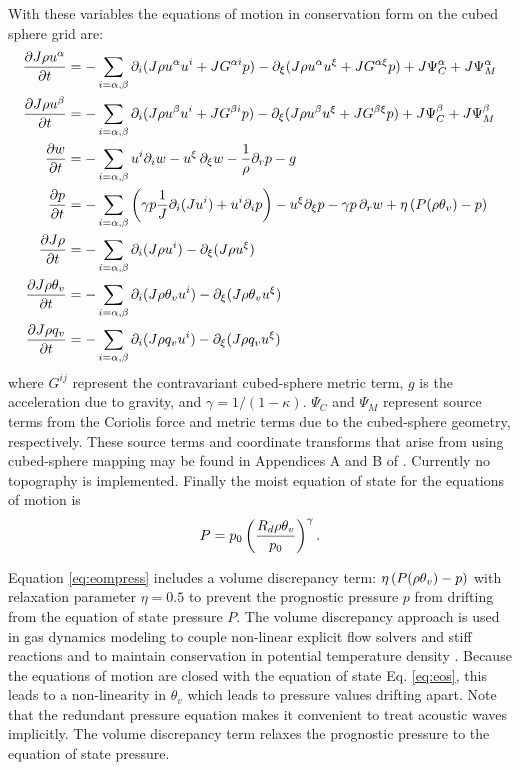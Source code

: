 With these variables the equations of motion in conservation form on the cubed sphere grid are:
\begin{align}
\frac{\partial J \rho u^{\alpha}}{\partial t} &=  - \sum_{i=\alpha, \beta} \partial_i (J \rho u^{\alpha} u^i + JG^{\alpha i} p )
    - \partial_{\xi} (J \rho u^{\alpha} u^{\xi} + JG^{\alpha \xi} p)  + J \Psi_C^\alpha + J \Psi_M^\alpha\\
\frac{\partial J \rho u^{\beta}}{\partial t} &=  - \sum_{i=\alpha, \beta} \partial_i (J \rho u^{\beta} u^i + JG^{\beta i} p )
    - \partial_{\xi} (J \rho u^{\beta} u^{\xi} + JG^{\beta \xi} p)
    + J \Psi_C^\beta + J \Psi_M^\beta \\
\frac{ \partial w}{\partial t} &=   - \sum_{i=\alpha, \beta} u^i \partial_i w - u^{\xi} \, \partial_{\xi} w - \frac{1}{\rho} \partial_{r} p - g \\
\frac{\partial p}{\partial t} &=   - \sum_{i=\alpha, \beta} \left( \gamma p \frac{1}{J} \partial_i (J u^i) 
    + u^i \partial_i p \right) - u^{\xi} \partial_{\xi} p  - \gamma p \, \partial_{r} w  + \eta \left(P(\rho \theta_v) -p \right) \label{eq:eompress}\\
\frac{ \partial J \rho}{\partial t} &=  - \sum_{i=\alpha, \beta} \partial_i (J \rho u^i) - \partial_{\xi} ( J \rho u^{\xi} ) \\
\frac{ \partial J \rho \theta_v}{\partial t} &=  - \sum_{i=\alpha, \beta} \partial_i (J \rho \theta_v u^i) - \partial_{\xi} ( J \rho \theta_v u^{\xi} ) \\
\frac{ \partial J \rho q_v}{\partial t} &=  - \sum_{i=\alpha, \beta} \partial_i (J \rho q_v u^i) - \partial_{\xi} ( J \rho q_v u^{\xi} )
\end{align}
where $G^{ij}$ represent the contravariant cubed-sphere metric term, $g$ is the acceleration
due to gravity, and $\gamma = 1 / (1 - \kappa)$. $\Psi_C$ and $\Psi_M$ represent source terms
from the Coriolis force and metric terms due to the cubed-sphere geometry, respectively. 
These source terms and coordinate transforms that arise from using cubed-sphere mapping may be found in
Appendices A and B of \cite{ullrich2012mcore}.
Currently no topography is implemented. 
Finally the moist equation of state for the equations of motion is
\begin{equation}
\label{eq:eos}
P = p_0\left(\frac{R_d\rho \theta_v}{p_0}\right)^\gamma.
\end{equation}

Equation \ref{eq:eompress} includes a volume discrepancy term: $\eta \left(P(\rho \theta_v) -p \right)$ 
with relaxation parameter $\eta = 0.5 $ to prevent the 
prognostic pressure $p$ from drifting from the equation of state pressure $P$. 
The volume discrepancy approach is used in gas dynamics 
modeling to couple non-linear explicit flow solvers and stiff 
reactions and to maintain conservation in potential 
temperature density \citep{day2000numerical}. Because the equations
of motion are closed with the equation of state Eq. \ref{eq:eos}, this leads to a non-linearity in
$\theta_v$ which leads to pressure values drifting apart. Note that the redundant pressure equation
makes it convenient to treat acoustic waves implicitly. 
The volume discrepancy term relaxes the prognostic pressure to the equation of state pressure.

